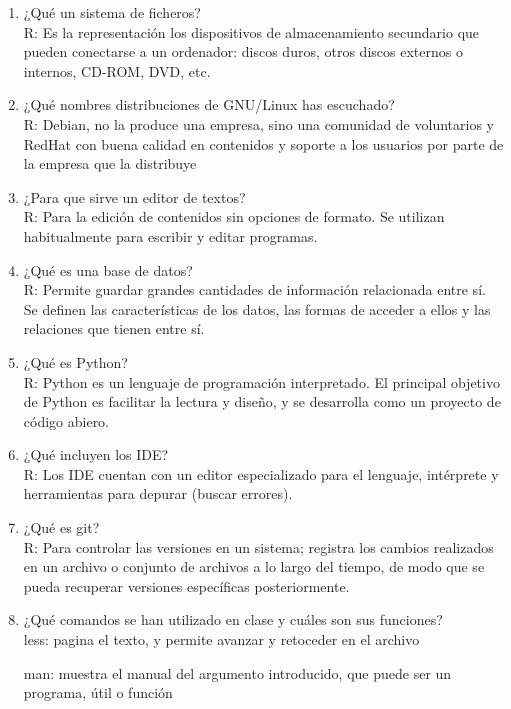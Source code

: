 \documentclass[etterpaper, 12pt, oneside]{article}%
\begin{document}
\begin{enumerate}
		\item ¿Qué un sistema de ficheros?
		\\R: Es la representación los dispositivos de almacenamiento secundario que pueden conectarse a un ordenador: discos duros, otros discos externos o internos, CD-ROM, DVD, etc. 
		
		\item ¿Qué nombres distribuciones de GNU/Linux has escuchado?
		\\R: Debian, no la produce una empresa, sino una comunidad de voluntarios y RedHat con buena calidad en contenidos y soporte a los usuarios por parte de la empresa que la distribuye

		\item ¿Para que sirve un editor de textos?
		\\R: Para la edición de contenidos sin opciones de formato. Se utilizan habitualmente para escribir y editar programas.
		
		\item ¿Qué es una base de datos?
		\\R: Permite guardar grandes cantidades de información relacionada entre sí. Se definen las características de los datos, las formas de acceder a ellos y las relaciones que tienen entre sí.
		
		\item ¿Qué es Python?
		\\R: Python es un lenguaje de programación interpretado. El principal objetivo de Python es facilitar la lectura y diseño, y se desarrolla como un proyecto de código abiero.
		
		\item ¿Qué incluyen los IDE?
		\\R: Los IDE cuentan con un editor especializado para el lenguaje, intérprete y herramientas para depurar (buscar errores).
		
		\item ¿Qué es git?
		\\R: Para controlar las versiones en un sistema; registra los cambios realizados en un archivo o conjunto de archivos a lo largo del
tiempo, de modo que se pueda recuperar versiones específicas posteriormente.

		\item ¿Qué comandos se han utilizado en clase y cuáles son sus funciones?
		\\less: pagina el texto, y permite avanzar y retoceder en el archivo

man: muestra el manual del argumento introducido, que puede ser un programa, útil o función


\end{enumerate}
\end{document}
